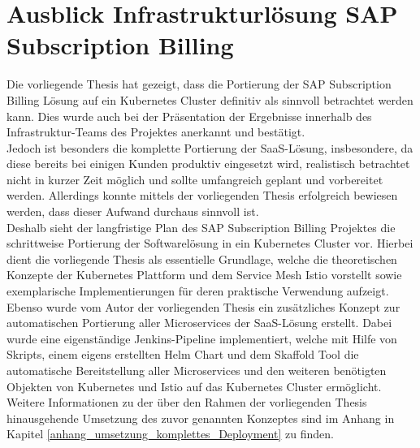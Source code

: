 \section{Ausblick Infrastrukturlösung SAP Subscription Billing}
\label{ausblick}
Die vorliegende Thesis hat gezeigt, dass die Portierung der SAP Subscription Billing Lösung auf ein Kubernetes Cluster definitiv als sinnvoll betrachtet werden kann. Dies wurde auch bei der Präsentation der Ergebnisse innerhalb des Infrastruktur-Teams des Projektes anerkannt und bestätigt.\\
Jedoch ist besonders die komplette Portierung der \ac{SaaS}-Lösung, insbesondere, da diese bereits bei einigen Kunden produktiv eingesetzt wird, realistisch betrachtet nicht in kurzer Zeit möglich und sollte umfangreich geplant und vorbereitet werden. Allerdings konnte mittels der vorliegenden Thesis erfolgreich bewiesen werden, dass dieser Aufwand durchaus sinnvoll ist.\\
Deshalb sieht der langfristige Plan des SAP Subscription Billing Projektes die schrittweise Portierung der Softwarelösung in ein Kubernetes Cluster vor. Hierbei dient die vorliegende Thesis als essentielle Grundlage, welche die theoretischen Konzepte der Kubernetes Plattform und dem Service Mesh Istio vorstellt sowie exemplarische Implementierungen für deren praktische Verwendung aufzeigt.\\
Ebenso wurde vom Autor der vorliegenden Thesis ein zusätzliches Konzept zur automatischen Portierung aller Microservices der \ac{SaaS}-Lösung erstellt. Dabei wurde eine eigenständige Jenkins-Pipeline implementiert, welche mit Hilfe von Skripts, einem eigens erstellten Helm Chart und dem Skaffold Tool die automatische Bereitstellung aller Microservices und den weiteren benötigten Objekten von Kubernetes und Istio auf das Kubernetes Cluster ermöglicht. Weitere Informationen zu der über den Rahmen der vorliegenden Thesis hinausgehende Umsetzung des zuvor genannten Konzeptes sind im Anhang in Kapitel \ref{anhang_umsetzung_komplettes_Deployment} zu finden.\\

\newpage
